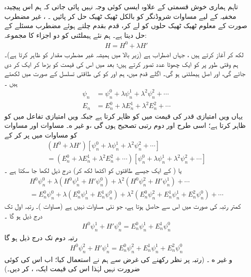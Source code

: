 تاہم ہماری  خوش قسمتی کے علاوہ ایسی   کوئی وجہ   نہیں  پائی  جاتی کہ  ہم اس  پیچیدہ مخفیہ کے لیے مساوات شروڈنگر کو بالکل ٹھیک ٹھیک حل کر  پائیں ۔ ،      غیر  مضطرب صورت کے معلوم ٹھیک ٹھیک حلوں کو لے کر،  قدم بقدم چلتے ہوئے مضطرب مسئلے کے    حل دیتا ہے۔  ہم نئے  ہیملٹنی کو دو اجزاء کا  مجموعہ:
\begin{align}
H = H^0 + \lambda H'
\end{align}
 لکھ کر آغاز کرتے ہیں ، جہاں  اضطراب ہے (زیر بالا میں  ہمیشہ  غیر  مضطرب مقدار کو ظاہر کرتا ہے)۔  ہم وقتی طور پر  کو ایک چھوٹا عدد تصور کرتے ہیں؛  بعد میں اس کی قیمت کو بڑھا کر ایک  کر دی جائے گی،  اور  اصل ہیملٹنی ہو گی۔ اگلے  قدم میں،   ہم  اور  کو  کی طاقتی تسلسل کے صورت میں لکھتے ہیں ۔
\begin{align}
\psi_n &= \psi_n^0 + \lambda\psi_n^1 + \lambda^2\psi_n^2+\cdots \label{مساوات_اضطراب_سائے_این}\\
E_n &= E_n^0 + \lambda E_n^1 + \lambda^2 E_n^2+\cdots \label{مساوات_اضطراب_ای_این}
\end{align} 
یہاں  ویں امتیازی قدر کی قیمت میں  کو  ظاہر کرتا ہے جبکہ  ویں امتیازی تفاعل میں  کو   ظاہر کرتا ہے؛ اسی طرح  اور  دوم رتبی تصحیح ہوں گی ،و غیر ه۔ مساوات  اور مساوات  کو مساوات  میں پر کر کے 
\begin{multline*}
(H^0 + \lambda H')[\psi_n^0 + \lambda \psi_n^1 + \lambda^2 \psi_n^2 + \cdots]\\
= (E_n^0 + \lambda E_n^1 + \lambda^2 E_n^2 + \cdots)[\psi_n^0 + \lambda \psi_n^1 + \lambda^2 \psi_n^2 + \cdots]
\end{multline*}
یا (  کے ایک جیسے طاقتوں کو اکٹھا لکھ کر)  درج ذیل لکھا جا سکتا ہے ۔
\begin{multline*}
H^0 \psi_n^0 + \lambda (H^0 \psi_n^1 + H' \psi_n^0) + \lambda^2 (H^0 \psi_n^2 + H' \psi_n^1) + \cdots \\
= E_n^0 \psi_n^0 + \lambda (E_n^0 \psi_n^1 + E_n^1 \psi_n^0) + \lambda^2 (E_n^0 \psi_n^2 + E_n^1 \psi_n^1 + E_n^2 \psi_n^0) + \cdots
\end{multline*}
 کمتر رتبہ  کی صورت میں اس سے  حاصل ہوتا ہے،  جو   نئی مساوات نہیں ہے (مساوات )۔ رتبہ اول  تک درج ذیل ہو گا ۔
\begin{align}\label{مساوات_اضطراب_رتبہ_اول}
H^0 \psi_n^1 + H' \psi_n^0 = E_n^0 \psi_n^1 + E_n^1 \psi_n^0
\end{align}
رتبہ دوم  تک درج ذیل ہو گا 
\begin{align}\label{مساوات_اضطراب_رتبہ_دوم}
H^0 \psi_n^2 + H' \psi_n^1 = E_n^0 \psi_n^2 + E_n^1 \psi_n^1 + E_n^2 \psi_n^0
\end{align}
و غیر ه ۔ (رتبہ  پر نظر رکھنے کی غرض سے ہم نے  استعمال کیا؛ اب اس کی کوئی  ضرورت نہیں  لہٰذا اس کی قیمت ایک، ، کر دیں۔)

